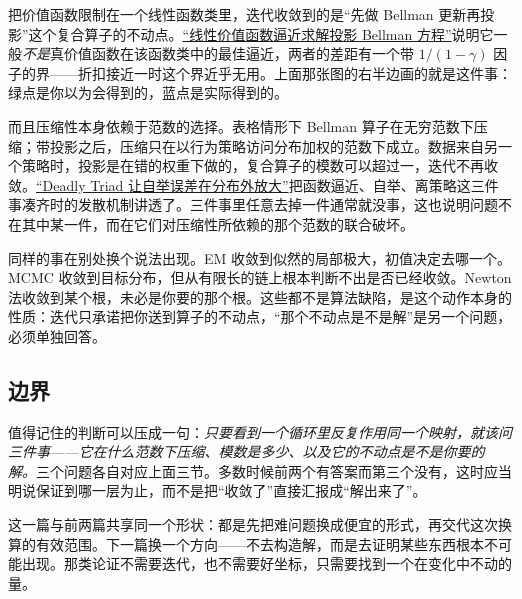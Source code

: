 把价值函数限制在一个线性函数类里，迭代收敛到的是``先做 Bellman 更新再投影''这个复合算子的不动点。\hyperref[sec:16-Control-and-Reinforcement-Learning/02-Reinforcement-Learning/05]{``线性价值函数逼近求解投影 Bellman 方程''}说明它一般\emph{不是}真价值函数在该函数类中的最佳逼近，两者的差距有一个带 \(1/(1-\gamma)\) 因子的界——折扣接近一时这个界近乎无用。上面那张图的右半边画的就是这件事：绿点是你以为会得到的，蓝点是实际得到的。

而且压缩性本身依赖于范数的选择。表格情形下 Bellman 算子在无穷范数下压缩；带投影之后，压缩只在以行为策略访问分布加权的范数下成立。数据来自另一个策略时，投影是在错的权重下做的，复合算子的模数可以超过一，迭代不再收敛。\hyperref[sec:16-Control-and-Reinforcement-Learning/02-Reinforcement-Learning/06]{``Deadly Triad 让自举误差在分布外放大''}把函数逼近、自举、离策略这三件事凑齐时的发散机制讲透了。三件事里任意去掉一件通常就没事，这也说明问题不在其中某一件，而在它们对压缩性所依赖的那个范数的联合破坏。

同样的事在别处换个说法出现。EM 收敛到似然的局部极大，初值决定去哪一个。MCMC 收敛到目标分布，但从有限长的链上根本判断不出是否已经收敛。Newton 法收敛到某个根，未必是你要的那个根。这些都不是算法缺陷，是这个动作本身的性质：迭代只承诺把你送到算子的不动点，``那个不动点是不是解''是另一个问题，必须单独回答。

\subsection{边界}

值得记住的判断可以压成一句：\emph{只要看到一个循环里反复作用同一个映射，就该问三件事——它在什么范数下压缩、模数是多少、以及它的不动点是不是你要的解。}三个问题各自对应上面三节。多数时候前两个有答案而第三个没有，这时应当明说保证到哪一层为止，而不是把``收敛了''直接汇报成``解出来了''。

这一篇与前两篇共享同一个形状：都是先把难问题换成便宜的形式，再交代这次换算的有效范围。下一篇换一个方向——不去构造解，而是去证明某些东西根本不可能出现。那类论证不需要迭代，也不需要好坐标，只需要找到一个在变化中不动的量。
